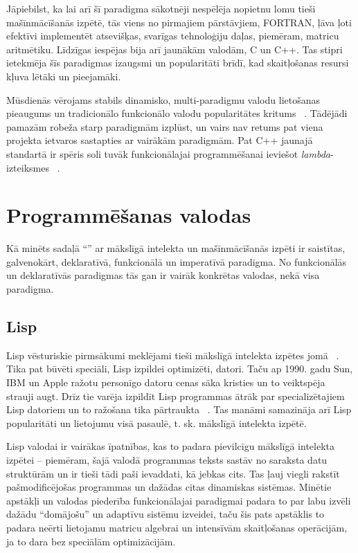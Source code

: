 \documentclass{ludis}
\begin{document}
Jāpiebilst, ka lai arī šī paradigma sākotnēji nespēlēja nopietnu lomu tieši mašīnmācīšanās izpētē, tās viens no pirmajiem pārstāvjiem, FORTRAN, ļāva ļoti efektīvi implementēt atsevišķas, svarīgas tehnoloģiju daļas, piemēram, matricu aritmētiku. Līdzīgas iespējas bija arī jaunākām valodām, C un C++. Tas stipri ietekmēja šīs paradigmas izaugsmi un popularitāti brīdī, kad skaitļošanas resursi kļuva lētāki un pieejamāki.

Mūsdienās vērojams stabils dinamisko, multi-paradigmu valodu lietošanas pieaugums un tradicionālo funkcionālo valodu popularitātes kritums ~\cite{tiobe_index}. Tādējādi pamazām robeža starp paradigmām izplūst, un vairs nav retums pat viena projekta ietvaros sastapties ar vairākām paradigmām. Pat C++ jaunajā standartā ir spēris soli tuvāk funkcionālajai programmēšanai ieviešot {\em lambda}-izteiksmes ~\cite{iso_cpp11}.

\section{Programmēšanas valodas} \label{sec:languages}
Kā minēts sadaļā ``'' ar mākslīgā intelekta un mašīnmācīšanās izpēti ir saistītas, galvenokārt, deklaratīvā, funkcionālā un imperatīvā paradigma. No funkcionālās un deklaratīvās paradigmas tās gan ir vairāk konkrētas valodas, nekā visa paradigma.

\subsection{Lisp}
Lisp vēsturiskie pirmsākumi meklējami tieši mākslīgā intelekta izpētes jomā ~\cite{hist_lisp}. Tika pat būvēti speciāli, Lisp izpildei optimizēti, datori. Taču ap 1990. gadu Sun, IBM un Apple ražotu personīgo datoru cenas sāka kristies un to veiktspēja strauji augt. Drīz tie varēja izpildīt Lisp programmas ātrāk par specializētajiem Lisp datoriem un to ražošana tika pārtraukta ~\cite[p.~209--210]{crevier_1993}. Tas manāmi samazināja arī Lisp popularitāti un lietojumu visā pasaulē, t. sk. mākslīgā intelekta izpētē.

Lisp valodai ir vairākas īpatnības, kas to padara pievilcīgu mākslīgā intelekta izpētei -- piemēram, šajā valodā programmas teksts sastāv no saraksta datu struktūrām un ir tieši tādi paši ievaddati, kā jebkas cits. Tas ļauj viegli rakstīt pašmodificējošas programmas un dažādas citas dinamiskas sistēmas. Minētie apstākļi un valodas piederība funkcionālajai paradigmai padara to par labu izvēli dažādu ``domājošu'' un adaptīvu sistēmu izveidei, taču šis pats apstāklis to padara neērti lietojamu matricu algebrai un intensīvām skaitļošanas operācijām, ja to dara bez speciālām optimizācijām.
\end{document}
